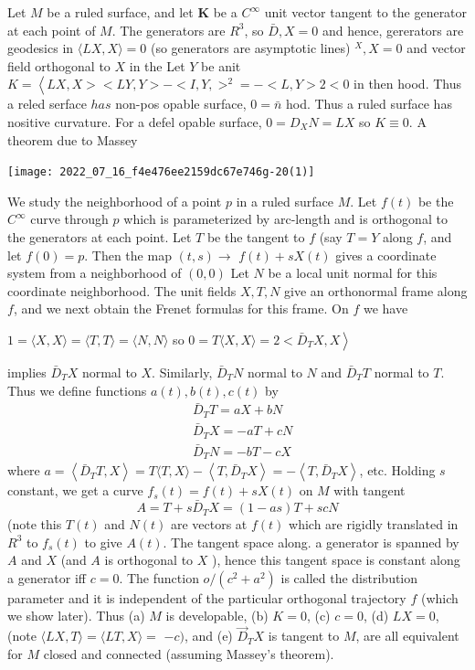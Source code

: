 \documentclass[10pt]{article}
\begin{document}
Let $M$ be a ruled surface, and let $\boldsymbol{K}$ be a $C^{\infty}$ unit vector tangent to the generator at each point of $M$. The generators are $R^{3}$, so $\bar{D}, X=0$ and hence, gererators are geodesics in $\langle L X, X\rangle=0$ (so generators are asymptotic lines) ${ }^{X}, X=0$ and vector field orthogonal to $X$ in the Let $Y$ be anit $K=\left\langle L X, X><L Y, Y>-<I, Y,>^{2}=-<L, Y>2<0\right.$ in then hood. Thus a reled serface $h a s$ non-pos opable surface, $0=\bar{n}$ hod. Thus a ruled surface has nositive curvature. For a defel opable surface, $0=D_{X} N=L X$ so $K \equiv 0$. A theorem due to Massey

\texttt{[image: 2022\_07\_16\_f4e476ee2159dc67e746g-20(1)]}

We study the neighborhood of a point $p$ in a ruled surface $M$. Let $f(t)$ be the $C^{\infty}$ curve through $p$ which is parameterized by arc-length and is orthogonal to the generators at each point. Let $T$ be the tangent to $f$ (say $T=Y$ along $f$, and let $f(0)=p$. Then the map $(t, s) \rightarrow$ $f(t)+s X(t)$ gives a coordinate system from a neighborhood of $(0,0)$ Let $N$ be a local unit normal for this coordinate neighborhood. The unit fields $X, T, N$ give an orthonormal frame along $f$, and we next obtain the Frenet formulas for this frame. On $f$ we have

$1=\langle X, X\rangle=\langle T, T\rangle=\langle N, N\rangle$ so $\left.0=T\langle X, X\rangle=2<\bar{D}_{T} X, X\right\rangle$

implies $\bar{D}_{T} X$ normal to $X$. Similarly, $\bar{D}_{T} N$ normal to $N$ and $\bar{D}_{T} T$ normal to $T$. Thus we define functions $a(t), b(t), c(t)$ by
$$
\begin{aligned}
&\bar{D}_{T} T=a X+b N \\
&\bar{D}_{T} X=-a T+c N \\
&\bar{D}_{T} N=-b T-c X
\end{aligned}
$$
where $a=\left\langle\bar{D}_{T} T, X\right\rangle=T\langle T, X\rangle-\left\langle T, \bar{D}_{T} X\right\rangle=-\left\langle T, \bar{D}_{T} X\right\rangle$, etc. Holding $s$ constant, we get a curve $f_{s}(t)=f(t)+s X(t)$ on $M$ with tangent
$$
A=T+s \bar{D}_{T} X=(1-a s) T+s c N
$$
(note this $T(t)$ and $N(t)$ are vectors at $f(t)$ which are rigidly translated in $R^{3}$ to $f_{s}(t)$ to give $A(t)$. The tangent space along. a generator is spanned by $A$ and $X$ (and $A$ is orthogonal to $X$ ), hence this tangent space is constant along a generator iff $c=0$. The function $o /\left(c^{2}+a^{2}\right)$ is called the distribution parameter and it is independent of the particular orthogonal trajectory $f$ (which we show later). Thus (a) $M$ is developable, (b) $K=0$, (c) $c=0$, (d) $L X=0$, (note $\langle L X, T\rangle=\langle L T, X\rangle=$ $-c)$, and (e) $\vec{D}_{T} X$ is tangent to $M$, are all equivalent for $M$ closed and connected (assuming Massey's theorem).
\end{document}

